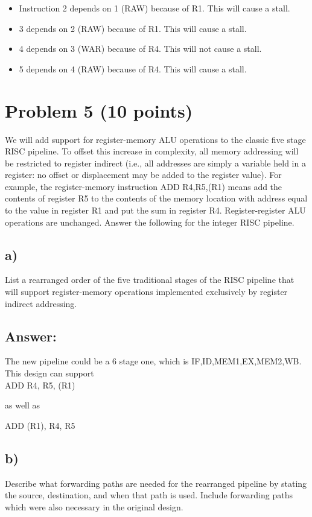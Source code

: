 \documentclass[letter,11pt,leqno]{article}
\begin{document}
\begin{itemize}
\item Instruction 2 depends on 1 (RAW) because of R1. This will cause a stall.
\item 3 depends on 2 (RAW) because of R1. This will cause a stall.
\item 4 depends on 3 (WAR) because of R4. This will not cause a stall.
\item 5 depends on 4 (RAW) because of R4. This will cause a stall.
\end{itemize}

\section*{Problem 5 (10 points)}We will add support for register-memory ALU operations to the classic five stage RISC pipeline. To offset this increase in complexity, all memory addressing will be restricted to register indirect (i.e., all addresses are simply a variable held in a register: no offset or displacement may be added to the register value). For example, the register-memory instruction ADD R4,R5,(R1) means add the contents of register R5 to the contents of the memory location with address equal to the value in register R1 and put the sum in register R4. Register-register ALU operations are unchanged. Answer the following for the integer RISC pipeline.

\subsection*{a)} List a rearranged order of the five traditional stages of the RISC pipeline that will support register-memory operations implemented exclusively by register indirect addressing.

\subsection*{Answer:}

The new pipeline could be a 6 stage one, which is IF,ID,MEM1,EX,MEM2,WB. This design can support\\

ADD R4, R5, (R1)

as well as 

ADD (R1), R4, R5

\subsection*{b)} Describe what forwarding paths are needed for the rearranged pipeline by stating the source, destination, and when that path is used. Include forwarding paths which were also necessary in the original design.
\end{document}
